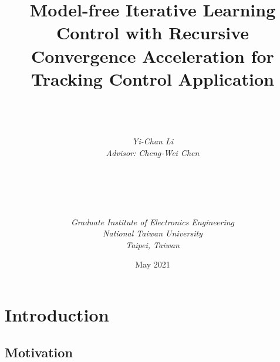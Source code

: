 \documentclass[a4paper, 12pt, twoside, openright]{mythesis}
\begin{document}
\title{\textbf{Model-free Iterative Learning Control with Recursive Convergence Acceleration for Tracking Control Application}}


\author{ \\  \\ \\
{\it Yi-Chan Li}\\
{\it Advisor: Cheng-Wei Chen } \\ \\ \\ \\  \\ \\
{\it Graduate Institute of Electronics Engineering}\\
{\it National Taiwan University} \\
{\it Taipei, Taiwan}\\ }

{\date{May 2021}}

\maketitle

\frontmatter

\tableofcontents
\listoffigures
\listoftables


\mainmatter








\chapter{Introduction}
\label{ch:intro}

\section{Motivation}
\label{sec:Motivation}
\end{document}
